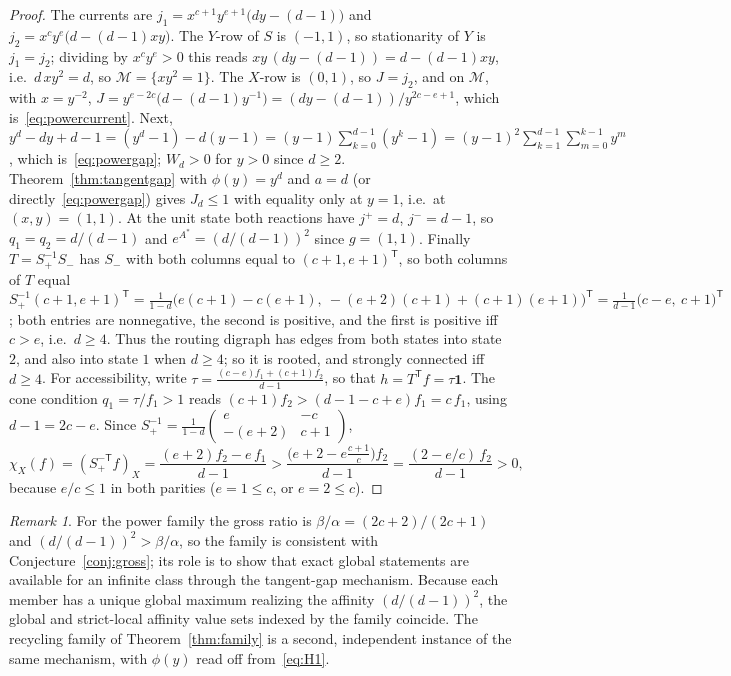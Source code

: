 \documentclass[11pt,reqno]{amsart}
\theoremstyle{plain}
\theoremstyle{definition}
\theoremstyle{remark}
\newtheorem{remark}[theorem]{Remark}
\numberwithin{equation}{section}
\newcommand{\one}{\mathbf{1}}
\newcommand{\Sp}{S_{+}}
\newcommand{\Sm}{S_{-}}
\newcommand{\T}{\mathsf{T}}
\begin{document}
\begin{proof}
The currents are $j_1=x^{c+1}y^{e+1}\big(dy-(d-1)\big)$ and $j_2=x^cy^e\big(d-(d-1)xy\big)$.  The $Y$-row of $S$ is $(-1,1)$, so stationarity of $Y$ is $j_1=j_2$; dividing by $x^cy^e>0$ this reads $xy\,(dy-(d-1))=d-(d-1)xy$, i.e.\ $d\,xy^2=d$, so $\mathcal M=\{xy^2=1\}$.  The $X$-row is $(0,1)$, so $J=j_2$, and on $\mathcal M$, with $x=y^{-2}$, $J=y^{e-2c}\big(d-(d-1)y^{-1}\big)=(dy-(d-1))/y^{2c-e+1}$, which is~\eqref{eq:powercurrent}.  Next, $y^d-dy+d-1=(y^d-1)-d(y-1)=(y-1)\sum_{k=0}^{d-1}(y^k-1)=(y-1)^2\sum_{k=1}^{d-1}\sum_{m=0}^{k-1}y^m$, which is~\eqref{eq:powergap}; $W_d>0$ for $y>0$ since $d\ge2$.  Theorem~\ref{thm:tangentgap} with $\phi(y)=y^d$ and $a=d$ (or directly~\eqref{eq:powergap}) gives $J_d\le1$ with equality only at $y=1$, i.e.\ at $(x,y)=(1,1)$.  At the unit state both reactions have $j^+=d$, $j^-=d-1$, so $q_1=q_2=d/(d-1)$ and $e^{A^*}=(d/(d-1))^2$ since $g=(1,1)$.  Finally $T=\Sp^{-1}\Sm$ has $\Sm$ with both columns equal to $(c+1,e+1)^{\T}$, so both columns of $T$ equal $\Sp^{-1}(c+1,e+1)^{\T}=\frac1{1-d}\big(e(c+1)-c(e+1),\ -(e+2)(c+1)+(c+1)(e+1)\big)^{\T}=\frac1{d-1}\big(c-e,\ c+1\big)^{\T}$; both entries are nonnegative, the second is positive, and the first is positive iff $c>e$, i.e.\ $d\ge4$.  Thus the routing digraph has edges from both states into state $2$, and also into state $1$ when $d\ge4$; so it is rooted, and strongly connected iff $d\ge4$.  For accessibility, write $\tau=\frac{(c-e)f_1+(c+1)f_2}{d-1}$, so that $h=T^{\T}f=\tau\one$.  The cone condition $q_1=\tau/f_1>1$ reads $(c+1)f_2>(d-1-c+e)f_1=c\,f_1$, using $d-1=2c-e$.  Since $\Sp^{-1}=\frac1{1-d}\begin{pmatrix}e&-c\\-(e+2)&c+1\end{pmatrix}$,
\[
\chi_X(f)=(\Sp^{-\T}f)_X=\frac{(e+2)f_2-e\,f_1}{d-1}>\frac{\big(e+2-e\tfrac{c+1}{c}\big)f_2}{d-1}=\frac{(2-e/c)\,f_2}{d-1}>0,
\]
because $e/c\le1$ in both parities ($e=1\le c$, or $e=2\le c$).
\end{proof}

\begin{remark}
For the power family the gross ratio is $\beta/\alpha=(2c+2)/(2c+1)$ and $(d/(d-1))^2>\beta/\alpha$, so the family is consistent with Conjecture~\ref{conj:gross}; its role is to show that exact global statements are available for an infinite class through the tangent-gap mechanism.  Because each member has a unique global maximum realizing the affinity $(d/(d-1))^2$, the global and strict-local affinity value sets indexed by the family coincide.  The recycling family of Theorem~\ref{thm:family} is a second, independent instance of the same mechanism, with $\phi(y)$ read off from~\eqref{eq:H1}.
\end{remark}
\end{document}

